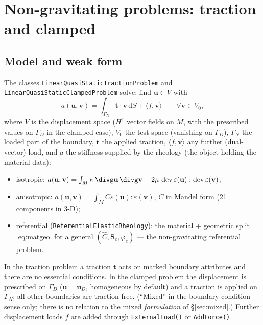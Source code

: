 \documentclass[11pt]{article}
\numberwithin{equation}{section}
\theoremstyle{remark}
\newcommand{\eps}{\varepsilon}
\newcommand{\dS}{\,\mathrm{d}S}
\newcommand{\dev}{\operatorname{dev}}
\newcommand{\vu}{\mathbf{u}}
\newcommand{\vv}{\mathbf{v}}
\newcommand{\vt}{\mathbf{t}}
\newcommand{\Ch}{\hat{C}}
\newcommand{\Se}{\mathbf{S}_e}
\newcommand{\code}[1]{\texttt{#1}}
\begin{document}
\section{Non-gravitating problems: traction and clamped}
\label{sec:nograv}

\subsection{Model and weak form}

The classes \code{LinearQuasiStaticTractionProblem} and
\code{LinearQuasiStaticClampedProblem} solve: find $\vu \in V$ with
\begin{equation}
  a(\vu, \vv) = \int_{\Gamma_N} \vt\cdot\vv \dS + \langle f, \vv\rangle
  \qquad \forall \vv \in V_0 ,
  \label{eq:nograv}
\end{equation}
where $V$ is the displacement space ($H^1$ vector fields on $M$, with the
prescribed values on $\Gamma_D$ in the clamped case), $V_0$ the test space
(vanishing on $\Gamma_D$), $\Gamma_N$ the loaded part of the boundary,
$\vt$ the applied traction, $\langle f,\vv\rangle$ any further
(dual-vector) load, and $a$ the stiffness supplied by the rheology (the
object holding the material data):
\begin{itemize}
\item isotropic: $a(\vu,\vv) = \int_M \kappa\,\divg\vu\,\divg\vv +
  2\mu\,\dev\eps(\vu):\dev\eps(\vv)$;
\item anisotropic: $a(\vu,\vv) = \int_M C\eps(\vu):\eps(\vv)$, $C$ in
  Mandel form (21 components in 3-D);
\item referential (\code{ReferentialElasticRheology}): the material +
  geometric split \eqref{eq:matgeo} for a general $(\Ch,\Se,\varphi_e)$ ---
  the non-gravitating referential problem.
\end{itemize}
In the traction problem a traction $\vt$ acts on marked boundary
attributes and there are no essential conditions. In the clamped problem
the displacement is prescribed on $\Gamma_D$ ($\vu = \vu_D$, homogeneous by
default) and a traction is applied on $\Gamma_N$; all other boundaries are
traction-free. (``Mixed'' in the boundary-condition sense only; there is no
relation to the mixed \emph{formulation} of \S\ref{sec:mixed}.) Further
displacement loads $f$ are added through \code{ExternalLoad()} or
\code{AddForce()}.
\end{document}
